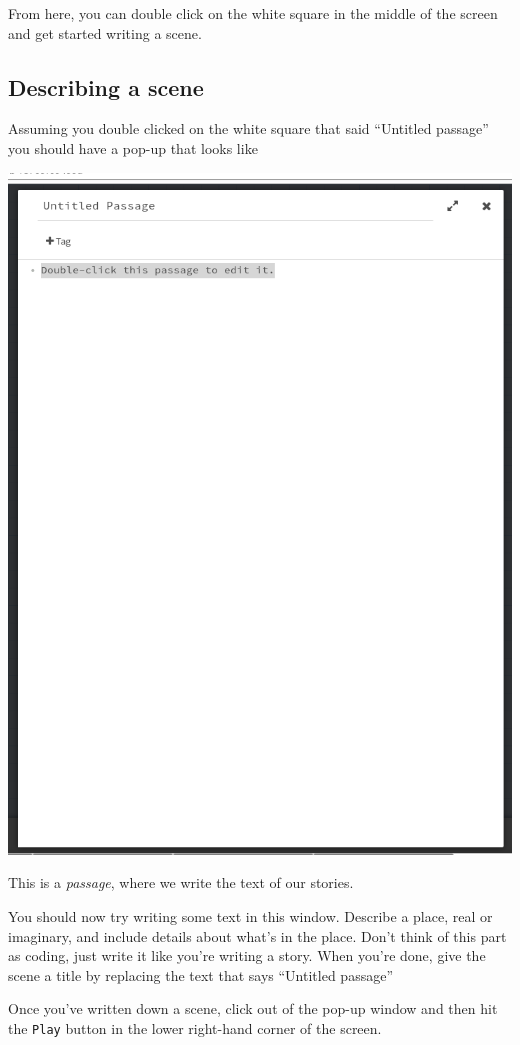 \documentclass[a5paper,11pt]{article}
\begin{document}
From here, you can double click on the white square in the middle of the screen and get started writing a scene. 
\subsection{Describing a scene}
Assuming you double clicked on the white square that said ``Untitled passage'' you should have a pop-up that looks like

\includegraphics[width=0.9\linewidth]{EditPassage}

This is a \emph{passage}, where we write the text of our stories.

\begin{framed}
  You should now try writing some text in this window. Describe a place, real or imaginary, and include details about what's in the place. Don't think of this part as coding, just write it like you're writing a story. When you're done, give the scene a title by replacing the text that says ``Untitled passage''
\end{framed}

Once you've written down a scene, click out of the pop-up window and then hit the \verb"Play" button in the lower right-hand corner of the screen.
\end{document}
